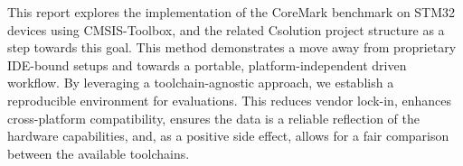 This report explores the implementation of the CoreMark benchmark on STM32 devices using CMSIS-Toolbox, and the related Csolution project structure as a step towards this goal. This method demonstrates a move away from proprietary IDE-bound setups and towards a portable, platform-independent driven workflow. By leveraging a toolchain-agnostic approach, we establish a reproducible environment for evaluations. This reduces vendor lock-in, enhances cross-platform compatibility, ensures the data is a reliable reflection of the hardware capabilities, and, as a positive side effect, allows for a fair comparison between the available toolchains.
